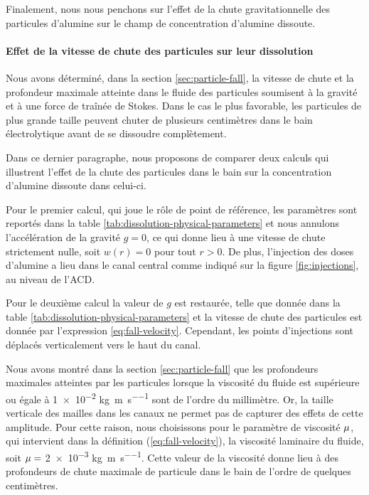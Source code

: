 Finalement, nous nous penchons sur l'effet de la chute
gravitationnelle des particules d'alumine sur le champ de
concentration d'alumine dissoute.

\paragraph{Effet de la vitesse de chute des particules sur leur
  dissolution}

Nous avons déterminé, dans la section \ref{sec:particle-fall}, la vitesse
de chute et la profondeur maximale atteinte dans le fluide des
particules soumisent à la gravité et à une force de traînée de
Stokes. Dans le cas le plus favorable, les particules de plus grande
taille peuvent chuter de plusieurs centimètres dans le bain
électrolytique avant de se dissoudre complètement.

Dans ce dernier paragraphe, nous proposons de comparer deux calculs
qui illustrent l'effet de la chute des particules dans le bain sur la
concentration d'alumine dissoute dans celui-ci.

Pour le premier calcul, qui joue le rôle de point de référence, les
paramètres sont reportés dans la table
\ref{tab:dissolution-physical-parameters} et nous annulons
l'accélération de la gravité $g = 0$, ce qui donne lieu à une vitesse
de chute strictement nulle, soit $w(r) = 0$ pour tout $r>0$. De plus,
l'injection des doses d'alumine a lieu dans le canal central comme
indiqué sur la figure \ref{fig:injections}, au niveau de l'ACD.

Pour le deuxième calcul la valeur de $g$ est restaurée, telle que
donnée dans la table \ref{tab:dissolution-physical-parameters} et la
vitesse de chute des particules est donnée par l'expression
\ref{eq:fall-velocity}. Cependant, les points d'injections sont
déplacés verticalement vers le haut du canal.

Nous avons montré dans la section \ref{sec:particle-fall} que les
profondeurs maximales atteintes par les particules lorsque la viscosité
du fluide est supérieure ou égale à \num{1e-2}
\si{\kilo\gram\per\meter\per\second} sont de l'ordre du
millimètre. Or, la taille verticale des mailles dans les canaux ne
permet pas de capturer des effets de cette amplitude. Pour cette
raison, nous choisissons pour le paramètre de viscosité
$\mu$, qui intervient dans la définition
(\ref{eq:fall-velocity}), la viscosité laminaire du fluide, soit
$\mu = $ \num{2e-3}
\si{\kilo\gram\per\meter\per\second}. Cette valeur de la viscosité
donne lieu à des profondeurs de chute maximale de particule dans le
bain de l'ordre de quelques centimètres.

